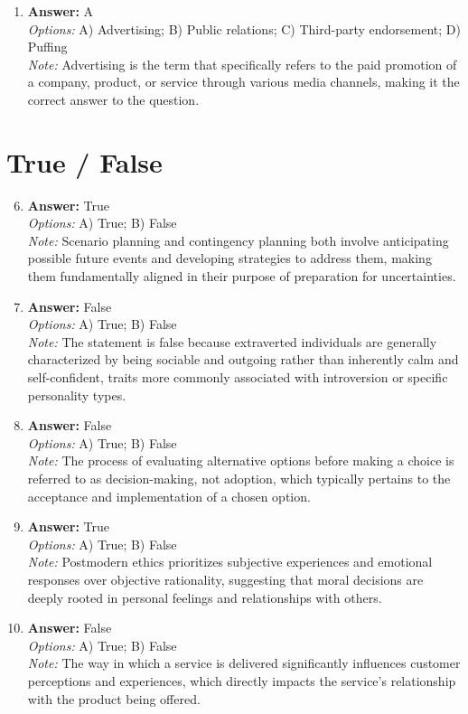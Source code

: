 \documentclass[12pt]{article}
\begin{document}
\begin{enumerate}[label=\arabic*.]
\\ \textit{Note:} The correct answer is "Research and evaluation" because all four planning models emphasize the necessity of gathering data and assessing outcomes to inform effective decision-making and strategic planning in business contexts.
\item \textbf{Answer:} A
\\ \textit{Options:} A) Advertising; B) Public relations; C) Third-party endorsement; D) Puffing
\\ \textit{Note:} Advertising is the term that specifically refers to the paid promotion of a company, product, or service through various media channels, making it the correct answer to the question.
\end{enumerate}

\section*{True / False}
\begin{enumerate}[label=\arabic*.]
\setcounter{enumi}{5}
\item \textbf{Answer:} True
\\ \textit{Options:} A) True; B) False
\\ \textit{Note:} Scenario planning and contingency planning both involve anticipating possible future events and developing strategies to address them, making them fundamentally aligned in their purpose of preparation for uncertainties.
\item \textbf{Answer:} False
\\ \textit{Options:} A) True; B) False
\\ \textit{Note:} The statement is false because extraverted individuals are generally characterized by being sociable and outgoing rather than inherently calm and self-confident, traits more commonly associated with introversion or specific personality types.
\item \textbf{Answer:} False
\\ \textit{Options:} A) True; B) False
\\ \textit{Note:} The process of evaluating alternative options before making a choice is referred to as decision-making, not adoption, which typically pertains to the acceptance and implementation of a chosen option.
\item \textbf{Answer:} True
\\ \textit{Options:} A) True; B) False
\\ \textit{Note:} Postmodern ethics prioritizes subjective experiences and emotional responses over objective rationality, suggesting that moral decisions are deeply rooted in personal feelings and relationships with others.
\item \textbf{Answer:} False
\\ \textit{Options:} A) True; B) False
\\ \textit{Note:} The way in which a service is delivered significantly influences customer perceptions and experiences, which directly impacts the service's relationship with the product being offered.
\end{enumerate}
\end{document}
